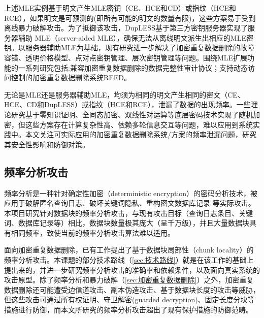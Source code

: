 上述MLE实例基于明文产生MLE密钥（CE、HCE和CD）或指纹（HCE和RCE），如果明文是可预测的(即所有可能的明文的数量有限)，这些方案易于受到离线暴力破解攻击。为了抵御该攻击，DupLESS基于第三方密钥服务器实现了服务器辅助 MLE（server-aided MLE），确保无法从离线明文派生出相应的MLE密钥。以服务器辅助MLE为基础，现有研究进一步解决了加密重复数据删除的故障容错、透明价格模型、点对点密钥管理、层次密钥管理等问题。围绕MLE扩展功能的一系列研究包括:兼容加密重复数据删除的数据完整性审计协议；支持动态访问控制的加密重复数据删除系统REED。

无论是MLE还是服务器辅助MLE，均须为相同的明文产生相同的密文（CE、HCE、CD和DupLESS）或指纹（HCE和RCE），泄漏了数据的出现频率。一些理论研究基于零知识证明、全同态加密、双线性对运算等底层密码技术实现了随机加密，但这些方案存在计算复杂性高、依赖多轮信息交互等问题，难以应用到系统实践中。本文关注可实际应用的加密重复数据删除系统/方案的频率泄漏问题，研究其安全性影响和防御对策。

\subsection{频率分析攻击}
\label{sec:传统频率分析攻击}

频率分析是一种针对确定性加密（deterministic encryption）的密码分析技术，被应用于破解匿名查询日志、破坏关键词隐私、重构密文数据库记录 等实际攻击。本项目研究针对数据块的频率分析攻击，与现有攻击目标（查询日志条目、关键词、数据库记录等）相比，数据块数量极其庞大（呈千万级），并且大量数据块具有相同频率，致使当前的频率分析攻击算法难以适用。

面向加密重复数据删除，已有工作提出了基于数据块局部性（chunk locality）的频率分析攻击。本课题的部分技术路线（\ref{sec:技术路线}）就是在该工作的基础上提出来的，并进一步研究频率分析攻击的准确率和依赖条件，以及面向真实系统的攻击原型。除了频率分析和暴力破解（\ref{sec:加密重复数据删除}）之外，加密重复数据删除还可能遭受边信道攻击、副本伪造攻击、基于数据块长度的攻击等威胁，但这些攻击可通过所有权证明、守卫解密(guarded decryption)、固定长度分块等措施进行防御，而本文所研究的频率分析攻击超出了现有保护措施的防御范畴。

